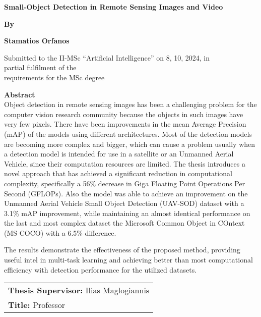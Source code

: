 




\begin{center}
    \textbf{\Large Small-Object Detection in Remote Sensing Images and Video}
\end{center}

\vspace{0.05in}

\begin{center}
    \textbf{\large By}
\end{center}

\vspace{0.05in}

\begin{center}
    \textbf{\large Stamatios Orfanos}
\end{center}

\vspace{0.05in}

\begin{center}
    Submitted to the II-MSc “Artificial Intelligence” on 8, 10, 2024, in \\
    partial fulfilment of the \\
    requirements for the MSc degree
\end{center}





\vspace{1cm}

\textbf{\Large Abstract} \\
Object detection in remote sensing images has been a challenging problem for the computer vision research community because the objects in such images have very few
pixels. There have been improvements in the mean Average Precision (mAP) of the models using different architectures. Most of the detection models are becoming more 
complex and bigger, which can cause a problem usually when a detection model is intended for use in a satellite or an Unmanned Aerial Vehicle, since their computation 
resources are limited. The thesis introduces a novel approach that has achieved a significant reduction in computational complexity, specifically a 56\% decrease in 
Giga Floating Point Operations Per Second (GFLOPs). Also the model was able to achieve an improvement on the Unmanned Aerial Vehicle Small Object Detection (UAV-SOD) 
dataset with a 3.1\% mAP improvement, while maintaining an almost identical performance on the last and most complex dataset the Microsoft Common Object in 
COntext (MS COCO) with a 6.5\% difference.

The results demonstrate the effectiveness of the proposed method, providing useful intel in multi-task learning and achieving better than most 
computational efficiency with detection performance for the utilized datasets.



\vspace{3.5in}


\begin{tabular}{l}
    \textbf{Thesis Supervisor:} Ilias Maglogiannis \\
    \textbf{Title:} Professor
\end{tabular}


